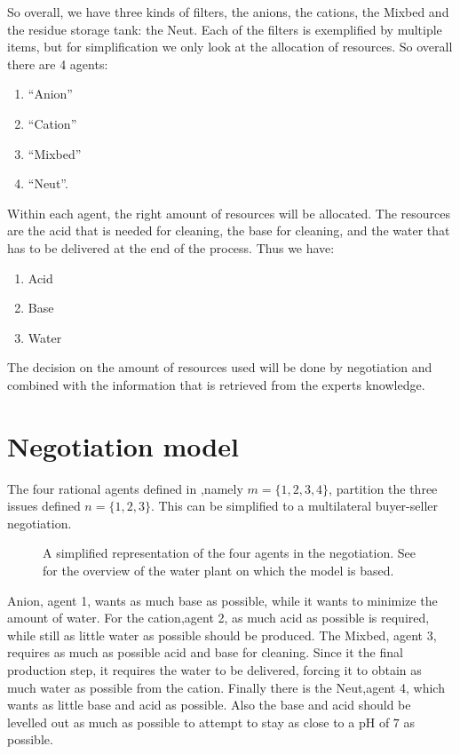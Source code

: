 So overall, we have three kinds of filters, the anions, the cations, the Mixbed and the residue storage tank: the Neut. Each of the filters is exemplified by multiple items, but for simplification we only look at the allocation of resources. So overall there are 4 agents:
\begin{enumerate}
	\item``Anion''
	\item``Cation''
	\item``Mixbed''
	\item``Neut''.
\end{enumerate}
Within each agent, the right amount of resources will be allocated. The resources are the acid that is needed for cleaning, the base for cleaning, and the water that has to be delivered at the end of the process. Thus we have:
\begin{enumerate}
	\item Acid
	\item Base
	\item Water
\end{enumerate}
 The decision on the amount of resources used will be done by negotiation and combined with the information that is retrieved from the experts knowledge.


\section{Negotiation model}
\label{sec:design:negmod}
The four rational agents defined in ,namely $m = \{1,2,3, 4\}$, partition the  three issues defined $n=\{1,2,3\}$. This can be simplified to a multilateral buyer-seller negotiation.

\begin{figure}[h]
	\centering
	\caption{A simplified representation of the four agents in the negotiation. See  for the overview of the water plant on which the model is based.}
	\label{fig:agent-plant}
\end{figure}
Anion, agent 1, wants as much base as possible, while it wants to minimize the amount of water. For the cation,agent 2, as much acid as possible is required, while still as little water as possible should be produced. The Mixbed, agent 3, requires as much as possible acid and base for cleaning. Since it the final production step, it requires the water to be delivered, forcing it to obtain as much water as possible from the cation. Finally there is the Neut,agent 4, which wants as little base and acid as possible. Also the base and acid should be levelled out as much as possible to attempt to stay as close to a pH of $7$ as possible. 

